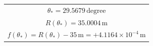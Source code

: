 \documentclass[border=12pt]{standalone}
\begin{document}
\color{weeknavy}
\begin{tabular}{c}
$\theta_* = 29.5679\,\mathrm{degree}$\\[4pt]
$R(\theta_*)=35.0004\,\mathrm{m}$\\[4pt]
$f(\theta_*)=R(\theta_*)-35\,\mathrm{m}=+4.1164\times10^{-4}\,\mathrm{m}$
\end{tabular}
\end{document}
